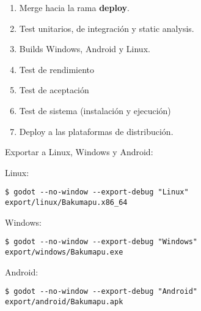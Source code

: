 \begin{enumerate}
  \item Merge hacia la rama \textbf{deploy}.
  \item Test unitarios, de integración y static analysis.
  \item Builds Windows, Android y Linux.
  \item Test de rendimiento
  \item Test de aceptación
  \item Test de sistema (instalación y ejecución)
  \item Deploy a las plataformas de distribución.
\end{enumerate}

Exportar a Linux, Windows y Android:

Linux:
\begin{lstlisting}
$ godot --no-window --export-debug "Linux" export/linux/Bakumapu.x86_64
\end{lstlisting}

Windows:
\begin{lstlisting}
$ godot --no-window --export-debug "Windows" export/windows/Bakumapu.exe
\end{lstlisting}

Android:
\begin{lstlisting}
$ godot --no-window --export-debug "Android" export/android/Bakumapu.apk
\end{lstlisting}
